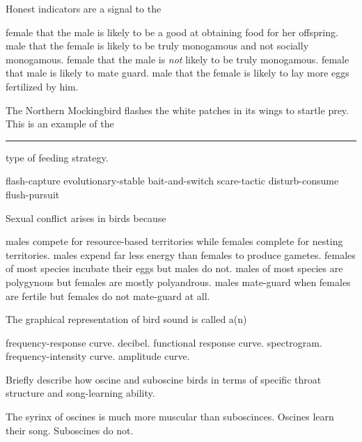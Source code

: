 \documentclass[12pt, addpoints]{exam}
\newcommand*\AnswerBox[2]{%
    \parbox[t][#1]{0.92\textwidth}{%
    \begin{solution}#2\end{solution}}
    \vspace{\stretch{1}}
}
\begin{document}
\begin{questions}
\question
Honest indicators are a signal to the

\begin{choices}
\correctchoice female that the male is likely to be a good at obtaining food for her offspring.
\choice male that the female is likely to be truly monogamous and not socially monogamous.
\choice female that the male is \emph{not} likely to be truly monogamous.
\choice female that male is likely to mate guard.
\choice male that the female is likely to lay more eggs fertilized by him.
\end{choices}


\question
The Northern Mockingbird flashes the white patches in its wings to startle prey. This is an example of the \rule{1in}{0.4pt} type of feeding strategy.

\begin{choices}
\choice flash-capture
\choice evolutionary-stable
\choice bait-and-switch
\choice scare-tactic
\choice disturb-consume
\correctchoice flush-pursuit
\end{choices}

\newpage

\question
Sexual conflict arises in birds because

\begin{choices}
\choice males compete for resource-based territories while females complete for nesting territories.
\correctchoice males expend far less energy than females to produce gametes.
\choice females of most species incubate their eggs but males do not.
\choice males of most species are polygynous but females are mostly polyandrous.
\choice males mate-guard when females are fertile but females do not mate-guard at all.
\end{choices}

\question
The graphical representation of bird sound is called a(n)

\begin{choices}
\choice	frequency-response curve.
\choice	decibel.
\choice	functional response curve.
\correctchoice	spectrogram.
\choice	frequency-intensity curve.
\choice	amplitude curve.
\end{choices}



\question[5]
Briefly describe how oscine and suboscine birds in terms of specific throat structure and song-learning ability.

\AnswerBox{0.1\textheight}{The syrinx of oscines is much more muscular than suboscinces. Oscines learn their song. Suboscines do not.}%


\end{questions}
\end{document}
